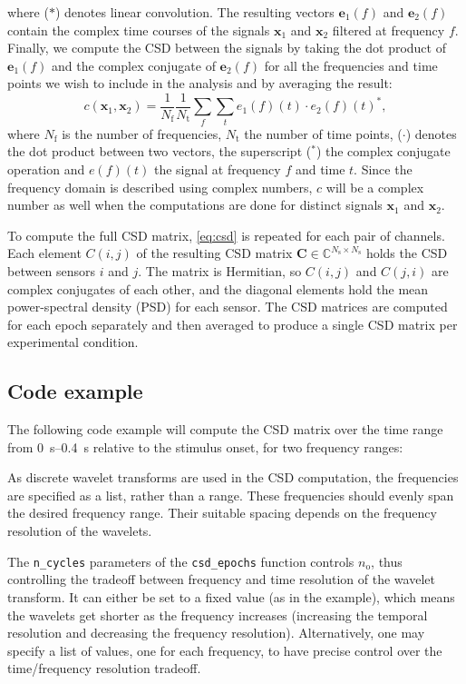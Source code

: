 \documentclass[utf8]{frontiersSCNS}
\newcommand{\code}[1]{\lstinline{#1}}
\newcommand{\bm}[1]{\mathbf{#1}}
\newcommand{\mat}[1]{\bm{#1}}
\renewcommand{\vec}[1]{\bm{#1}}
\newcommand{\explaincmat}[3]{$\mat{#1} \in \mathbb{C}^{#2 \times #3}$}
\begin{document}
where ($*$) denotes linear convolution.
The resulting vectors $\vec{e}_1(f)$ and $\vec{e}_2(f)$ contain the complex time courses of the signals $\vec{x}_1$ and $\vec{x}_2$ filtered at frequency $f$.
Finally, we compute the CSD between the signals by taking the dot product of $\vec{e}_1(f)$ and the complex conjugate of $\vec{e}_2(f)$ for all the frequencies and time points we wish to include in the analysis and by averaging the result:
\begin{equation}\label{eq:csd}
    c(\vec{x}_1, \vec{x}_2) = \frac{1}{N_\text{f}} \frac{1}{N_\text{t}} \sum_{f} \sum_{t}{e_1(f)(t) \cdot {e_2(f)(t)}^*},
\end{equation}
where $N_\text{f}$ is the number of frequencies, $N_\text{t}$ the number of time points, ($\cdot$) denotes the dot product between two vectors, the superscript ($^*$) the complex conjugate operation and $e(f)(t)$ the signal at frequency $f$ and time $t$. 
Since the frequency domain is described using complex numbers, $c$ will be a complex number as well when the computations are done for distinct signals $\vec{x}_1$ and $\vec{x}_2$.

To compute the full CSD matrix, \autoref{eq:csd} is repeated for each pair of channels.
Each element $C(i, j)$ of the resulting CSD matrix \explaincmat{C}{N_\text{s}}{N_\text{s}} holds the CSD between sensors $i$ and $j$.
The matrix is Hermitian, so $C(i, j)$ and $C(j, i)$ are complex conjugates of each other, and the diagonal elements hold the mean power-spectral density (PSD) for each sensor.
The CSD matrices are computed for each epoch separately and then averaged to produce a single CSD matrix per experimental condition.

\subsection{Code example}

The following code example will compute the CSD matrix over the time range from \SIrange{0}{0.4}{\second} relative to the stimulus onset, for two frequency ranges:


As discrete wavelet transforms are used in the CSD computation, the frequencies are specified as a list, rather than a range.
These frequencies should evenly span the desired frequency range.
Their suitable spacing depends on the frequency resolution of the wavelets.

The \code{n_cycles} parameters of the \code{csd_epochs} function controls $n_\text{o}$, thus controlling the tradeoff between frequency and time resolution of the wavelet transform.
It can either be set to a fixed value (as in the example), which means the wavelets get shorter as the frequency increases (increasing the temporal resolution and decreasing the frequency resolution).
Alternatively, one may specify a list of values, one for each frequency, to have precise control over the time/frequency resolution tradeoff.
\end{document}
